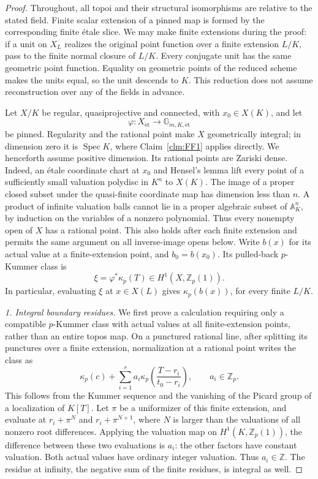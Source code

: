 \begin{proof}
Throughout, all topoi and their structural isomorphisms are
relative to the stated field. Finite scalar extension of a
pinned map is formed by the corresponding finite \'etale
slice. We may make finite extensions during the proof:
if a unit on \(X_L\) realizes the original point function
over a finite extension \(L/K\), pass to the finite normal
closure of \(L/K\). Every conjugate unit has the same
geometric point function. Equality on geometric points of
the reduced scheme makes the units equal, so the unit
descends to \(K\). This reduction does not assume
reconstruction over any of the fields in advance.

Let \(X/K\) be regular, quasiprojective and connected, with
\(x_0\in X(K)\), and let
\[
 \varphi:X_{\mathrm{\acute et}}\longrightarrow
                    \mathbb G_{m,K,\mathrm{\acute et}}
\]
be pinned. Regularity and the rational point make \(X\)
geometrically integral; in dimension zero it is \(\operatorname{Spec}K\),
where Claim~\ref{clm:FF1} applies directly. We henceforth
assume positive dimension. Its rational points are Zariski
 dense. Indeed, an \'etale coordinate chart at \(x_0\)
and Hensel's lemma lift every point of a sufficiently
small valuation polydisc in \(K^n\) to \(X(K)\).
The image of a proper closed subset under the quasi-finite
coordinate map has dimension less than \(n\). A product
of infinite valuation balls cannot lie in a proper
algebraic subset of \(\mathbb A^n_K\), by induction
on the variables of a nonzero polynomial. Thus every
nonempty open of \(X\) has a rational point. This
also holds after each finite extension and permits the
same argument on all inverse-image opens below. Write \(b(x)\) for its actual
value at a finite-extension point, and \(b_0=b(x_0)\).
Its pulled-back \(p\)-Kummer class is
\[
                   \xi=\varphi^*\kappa_p(T)
                          \in H^1(X,\mathbb Z_p(1)).
\]
In particular, evaluating \(\xi\) at \(x\in X(L)\)
gives \(\kappa_p(b(x))\), for every finite \(L/K\).

\emph{1. Integral boundary residues.}
We first prove a calculation requiring only a compatible
\(p\)-Kummer class with actual values at all finite-extension
points, rather than an entire topos map. On a punctured
rational line, after splitting its punctures over a finite
extension, normalization at a rational point writes the
class as
\[
 \kappa_p(c)+\sum_{i=1}^r a_i
       \kappa_p\left(\frac{T-r_i}{t_0-r_i}\right),
                  \qquad a_i\in\mathbb Z_p.             \tag{FF.26.1}
\]
This follows from the Kummer sequence and the vanishing of
the Picard group of a localization of \(K[T]\).
Let \(\pi\) be a uniformizer of this finite extension,
and evaluate at \(r_i+\pi^N\) and \(r_i+\pi^{N+1}\),
where \(N\) is larger than the valuations of all nonzero
root differences. Applying the valuation map on
\(H^1(K,\mathbb Z_p(1))\), the difference between these
two evaluations is \(a_i\): the other factors have
constant valuation. Both actual values have ordinary
integer valuation. Thus \(a_i\in\mathbb Z\). The residue
at infinity, the negative sum of the finite residues,
is integral as well.


\end{proof}
